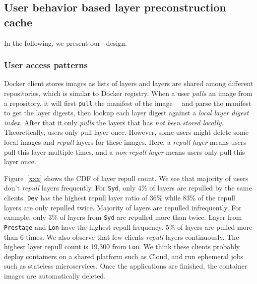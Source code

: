 
\subsection{User behavior based layer preconstruction cache}
\label{sec:cache-design}
In the following, we present our \sysname~\preconstructcachename design.
\subsubsection{User access patterns}

Docker client stores images as lists of layers and layers are shared among different repositories, which is similar to Docker registry.
When a user \emph{pulls} an image from a repository, 
it will first \texttt{pull} the manifest of the image~\cite{docker}~\cite{dockerworkload} and 
parse the manifest to get the layer digests,
then lookup each layer digest against a \emph{local layer digest index}.
After that it only \emph{pulls} the layers that has \emph{not been stored locally}.
Theoretically, users only pull layer once. 
However, some users might delete some local images and \emph{repull} layers for these images.
Here, a \emph{repull layer} means users pull this layer multiple times,
and a \emph{non-repull layer} means users only pull this layer once.

Figure~\ref{xxx} shows the CDF of layer repull count.
We see that majority of users don't \emph{repull} layers frequently.
For \texttt{Syd}, only 4\% of layers are repulled by the same clients.
\texttt{Dev} has the highest repull layer ratio of 36\% while 83\% of the repull layers are only repulled twice.
Majority of layers are repulled infrequently.
For example, only 3\% of layers from \texttt{Syd} are repulled more than twice.
Layer from \texttt{Prestage} and \texttt{Lon} have the highest repull frequency.
5\% of layers are pulled more than 6 times.
We also observe that few clients \emph{repull} layers continuously.
The highest layer repull count is 19,300 from \texttt{Lon}.
We think these clients probably deploy containers on a shared platform such as Cloud,
and run ephemeral jobs such as stateless microservices. 
Once the applications are finished, the container images are automatically deleted.

